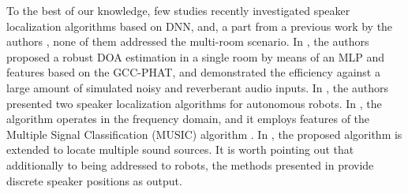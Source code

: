 \documentclass[review]{elsarticle}
\begin{document}




To the best of our knowledge, few studies recently investigated speaker localization algorithms based on DNN, and, a part from a previous work by the authors \cite{vesperini2016sloc}, none of them addressed the multi-room scenario. In \cite{xiao2015learning}, the authors proposed a robust DOA estimation in a single room by means of an MLP and features based on the GCC-PHAT, and demonstrated the efficiency against a large amount of simulated noisy and reverberant audio inputs. In \cite{Takeda2016a,Takeda2016b}, the authors presented two speaker localization algorithms for autonomous robots. In \cite{Takeda2016a}, the algorithm operates in the frequency domain, and it employs features of the Multiple Signal Classification (MUSIC) algorithm \cite{Schmidt86}. In \cite{Takeda2016b}, the proposed algorithm is extended to locate multiple sound sources. It is worth pointing out that additionally to being addressed to robots, the methods presented in \cite{Takeda2016a,Takeda2016b} provide discrete speaker positions as output.
\end{document}
